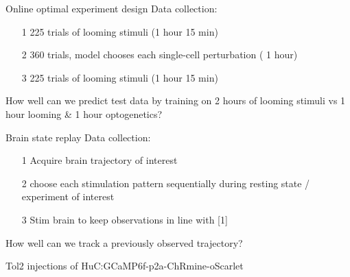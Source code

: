 \begin{frame}{ Online optimal experiment design }
    Data collection:
    \begin{itemize}
        \item [1] 225 trials of looming stimuli (1 hour 15 min)
        \item [2] 360 trials, model chooses each single-cell perturbation ( 1 hour)
        \item [3] 225 trials of looming stimuli (1 hour 15 min)
    \end{itemize}{}

    How well can we predict test data by training on 2 hours of looming stimuli vs 1 hour looming \& 1 hour optogenetics?
\end{frame}{}


\begin{frame}{ Brain state replay }
    Data collection:
    \begin{itemize}
        \item [1] Acquire brain trajectory of interest
        \item [2] choose each stimulation pattern sequentially during resting state / experiment of interest
        \item [3] Stim brain to keep observations in line with [1]
    \end{itemize}{}

    How well can we track a previously observed trajectory?

\end{frame}{}

\begin{frame}[t]{Tol2 injections of HuC:GCaMP6f-p2a-ChRmine-oScarlet}{}
\end{frame}
